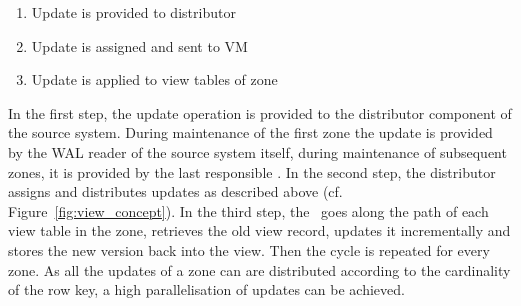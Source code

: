 \begin{enumerate}
	\item Update is provided to distributor
	\item Update is assigned and sent to VM
	\item Update is applied to view tables of zone
\end{enumerate} 


In the first step, the update operation is provided to the distributor
component of the source system. During maintenance of the first zone
the update is provided by the WAL reader of the source system itself, 
during maintenance of subsequent zones, it is provided by the last 
responsible \VM. In the second step, the distributor assigns and 
distributes updates as described above (cf. Figure~\ref{fig:view_concept}).
In the third step, the \VM\ goes along the path of each view table in
the zone, retrieves the old view record, updates it incrementally and 
stores the new version back into the view. Then the cycle is repeated
for every zone. As all the updates of a zone can are distributed 
according to the cardinality of the row key, a high parallelisation of 
updates can be achieved.


%

%
%


